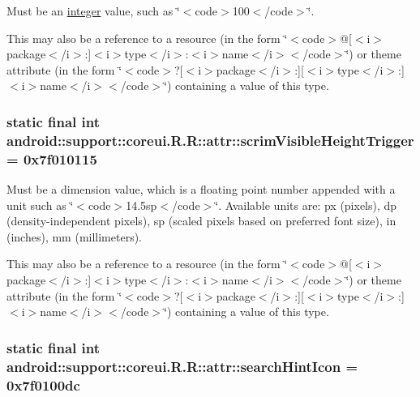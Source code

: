 Must be an \hyperlink{classandroid_1_1support_1_1coreui_1_1_r_1_1integer}{integer} value, such as \char`\"{}$<$code$>$100$<$/code$>$\char`\"{}. 

This may also be a reference to a resource (in the form \char`\"{}$<$code$>$@\mbox{[}$<$i$>$package$<$/i$>$:\mbox{]}$<$i$>$type$<$/i$>$:$<$i$>$name$<$/i$>$$<$/code$>$\char`\"{}) or theme attribute (in the form \char`\"{}$<$code$>$?\mbox{[}$<$i$>$package$<$/i$>$:\mbox{]}\mbox{[}$<$i$>$type$<$/i$>$:\mbox{]}$<$i$>$name$<$/i$>$$<$/code$>$\char`\"{}) containing a value of this type. \hypertarget{classandroid_1_1support_1_1coreui_1_1_r_1_1attr_673a8d725a877a5162ecc6723cb93640}{
\subsubsection[{scrimVisibleHeightTrigger}]{\setlength{\rightskip}{0pt plus 5cm}static final int android::support::coreui.R.R::attr::scrimVisibleHeightTrigger = 0x7f010115}}
\label{classandroid_1_1support_1_1coreui_1_1_r_1_1attr_673a8d725a877a5162ecc6723cb93640}


Must be a dimension value, which is a floating point number appended with a unit such as \char`\"{}$<$code$>$14.5sp$<$/code$>$\char`\"{}. Available units are: px (pixels), dp (density-independent pixels), sp (scaled pixels based on preferred font size), in (inches), mm (millimeters). 

This may also be a reference to a resource (in the form \char`\"{}$<$code$>$@\mbox{[}$<$i$>$package$<$/i$>$:\mbox{]}$<$i$>$type$<$/i$>$:$<$i$>$name$<$/i$>$$<$/code$>$\char`\"{}) or theme attribute (in the form \char`\"{}$<$code$>$?\mbox{[}$<$i$>$package$<$/i$>$:\mbox{]}\mbox{[}$<$i$>$type$<$/i$>$:\mbox{]}$<$i$>$name$<$/i$>$$<$/code$>$\char`\"{}) containing a value of this type. \hypertarget{classandroid_1_1support_1_1coreui_1_1_r_1_1attr_b26c42f13fe728d7b073496fddbaac13}{
\subsubsection[{searchHintIcon}]{\setlength{\rightskip}{0pt plus 5cm}static final int android::support::coreui.R.R::attr::searchHintIcon = 0x7f0100dc}}
\label{classandroid_1_1support_1_1coreui_1_1_r_1_1attr_b26c42f13fe728d7b073496fddbaac13}


